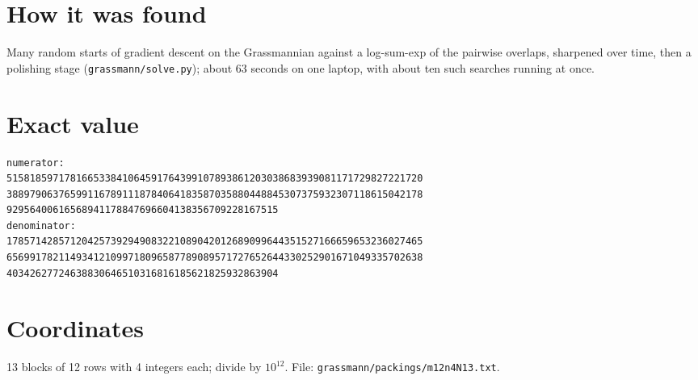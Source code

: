 \documentclass[11pt,a4paper]{article}
\begin{document}
\section{How it was found}
Many random starts of gradient descent on the Grassmannian against a log-sum-exp of the pairwise overlaps, sharpened over time, then a polishing stage (\texttt{grassmann/solve.py}); about 63 seconds on one laptop, with about ten such searches running at once.


\appendix
\section{Exact value}
{\small
\begin{verbatim}
numerator:
515818597178166533841064591764399107893861203038683939081171729827221720
388979063765991167891118784064183587035880448845307375932307118615042178
92956400616568941178847696604138356709228167515
denominator:
178571428571204257392949083221089042012689099644351527166659653236027465
656991782114934121099718096587789089571727652644330252901671049335702638
40342627724638830646510316816185621825932863904
\end{verbatim}}

\section{Coordinates}
13 blocks of 12 rows with 4 integers each; divide by $10^{12}$. File: \texttt{grassmann/packings/m12n4N13.txt}.
{\tiny
\begin{multicols}{3}
\end{multicols}}
\end{document}
